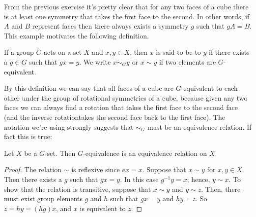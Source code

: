 From the previous exercise it's pretty clear that for any two faces of a cube there is at least one symmetry that takes the first face to the second.  In other words, if $A$ and $B$ represent faces then there always exists a symmetry $g$ such that $gA=B$.  This example motivates the following definition.

\begin{defn}\label{GEquivalent}
If a group $G$ acts on a set $X$ and $x, y \in X$, then $x$ is said to be
 to $y$ if there exists a
$g \in G$ such that $gx =y$. We write $x \sim_Gy$ or $x \sim y$ if
two elements are $G$-equivalent.
\end{defn}
By this definition we can say that all faces of a cube are $G$-equivalent to each other under the group of rotational symmetries of a cube, because given any two faces we can always find a rotation that takes the first face to the second face (and the inverse rotationtakes the second face back to the first face).
The notation we're using strongly suggests that $\sim_G$ must be an equivalence relation.  If fact this is true:

\begin{prop}{}
Let $X$ be a $G$-set. Then $G$-equivalence is an equivalence relation
on $X$. 
\end{prop}
\begin{proof}
The relation $\sim$ is reflexive since $ex = x$. Suppose that $x \sim
y$ for $x, y \in X$. Then there exists a $g$ such that $gx = y$. In
this case $g^{-1}y=x$; hence, $y \sim x$. To show that the relation is
transitive, suppose that $x \sim y$ and $y \sim z$. Then, there must
exist group elements $g$ and $h$ such that $gx = y$ and $hy= z$. So $z
= hy = (hg)x$, and $x$ is equivalent to $z$.
\end{proof}

